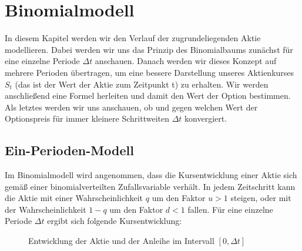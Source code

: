 \chapter{Binomialmodell}
\label{cha:binomialmodell}

In diesem Kapitel werden wir den Verlauf der zugrundeliegenden Aktie modellieren. Dabei werden wir uns das Prinzip des Binomialbaums zunächst für eine einzelne Periode $\Delta t$ anschauen. Danach werden wir dieses Konzept auf mehrere Perioden übertragen, um eine bessere Darstellung unseres Aktienkurses $S_t$ (das ist der Wert der Aktie zum Zeitpunkt t) zu erhalten. Wir werden anschließend eine Formel herleiten und damit den Wert der Option bestimmen. Als letztes werden wir uns anschauen, ob und gegen welchen Wert der Optionspreis für immer kleinere Schrittweiten $\Delta t$ konvergiert.

\section{Ein-Perioden-Modell}        %
\label{cha:Ein-Perioden-Modell}      %
Im Binomialmodell wird angenommen, dass die Kursentwicklung einer Aktie sich gemäß einer binomialverteilten Zufallsvariable verhält. In jedem Zeitschritt kann die Aktie mit einer Wahrscheinlichkeit $q$ um den Faktor $u > 1$ steigen, oder mit der Wahrscheinlichkeit $1-q$ um den Faktor $d < 1$ fallen.
Für eine einzelne Periode $\Delta t$ ergibt sich folgende Kursentwicklung:

\begin{figure}[htbp!]
    \caption{Entwicklung der Aktie und der Anleihe im Intervall $\left[0,\Delta t\right]$}
\end{figure}

